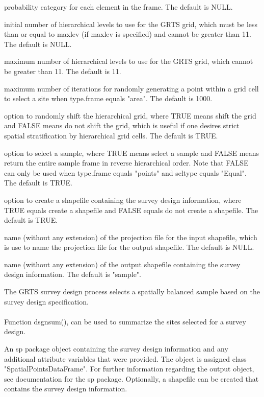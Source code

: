 \begin{Arguments}
\begin{ldescription}
probability category for each element in the frame.  The default is
NULL.
\item[\code{startlev}] initial number of hierarchical levels to use for the GRTS
grid, which must be less than or equal to maxlev (if maxlev is specified)
and cannot be greater than 11.  The default is NULL.
\item[\code{maxlev}] maximum number of hierarchical levels to use for the GRTS grid,
which cannot be greater than 11.  The default is 11.
\item[\code{maxtry}] maximum number of iterations for randomly generating a point
within a grid cell to select a site when type.frame equals "area".  The
default is 1000.
\item[\code{shift.grid}] option to randomly shift the hierarchical grid, where TRUE
means shift the grid and FALSE means do not shift the grid, which is
useful if one desires strict spatial stratification by hierarchical grid
cells.  The default is TRUE.
\item[\code{do.sample}] option to select a sample, where TRUE means select a sample
and FALSE means return the entire sample frame in reverse hierarchical
order.  Note that FALSE can only be used when type.frame equals "points"
and seltype equals "Equal".  The default is TRUE.
\item[\code{shapefile}] option to create a shapefile containing the survey design
information, where TRUE equals create a shapefile and FALSE equals do not
create a shapefile.  The default is TRUE.
\item[\code{prjfilename}] name (without any extension) of the projection file for the
input shapefile, which is use to name the projection file for the output
shapefile.  The default is NULL.
\item[\code{out.shape}] name (without any extension) of the output shapefile
containing the survey design information.  The default is "sample".
\end{ldescription}
\end{Arguments}
\begin{Details}\relax
The GRTS survey design process selects a spatially balanced sample based on
the survey design specification.\\\\
Function dsgnsum(), can be used to summarize the sites selected for a survey
design.
\end{Details}
\begin{Value}
An sp package object containing the survey design information and any
additional attribute variables that were provided.  The object is assigned
class "SpatialPointsDataFrame".  For further information regarding the
output object, see documentation for the sp package.  Optionally, a
shapefile can be created that contains the survey design information.
\end{Value}
